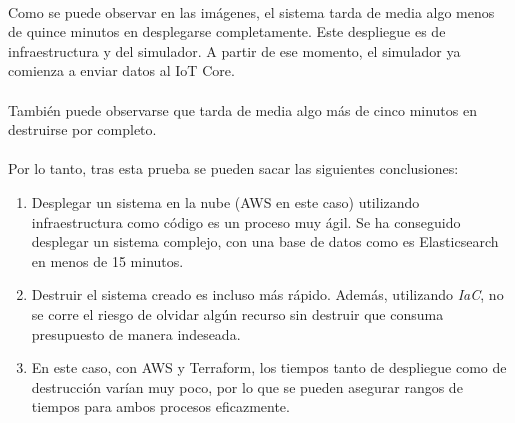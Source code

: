 \documentclass[../../memoria.tex]{subfiles}
\begin{document}
\paragraph{}
Como se puede observar en las imágenes, el sistema tarda de media algo menos de quince minutos en desplegarse completamente. Este despliegue es de infraestructura y del simulador. A partir de ese momento, el simulador ya comienza a enviar datos al IoT Core.

\paragraph{}
También puede observarse que tarda de media algo más de cinco minutos en destruirse por completo.

\paragraph{}
Por lo tanto, tras esta prueba se pueden sacar las siguientes conclusiones:

\begin{enumerate}
    \item Desplegar un sistema en la nube (AWS en este caso) utilizando infraestructura como código es un proceso muy ágil. Se ha conseguido desplegar un sistema complejo, con una base de datos como es Elasticsearch en menos de 15 minutos.
    \item Destruir el sistema creado es incluso más rápido. Además, utilizando \textit{IaC}, no se corre el riesgo de olvidar algún recurso sin destruir que consuma presupuesto de manera indeseada.
    \item En este caso, con AWS y Terraform, los tiempos tanto de despliegue como de destrucción varían muy poco, por lo que se pueden asegurar rangos de tiempos para ambos procesos eficazmente.
\end{enumerate}
\end{document}
